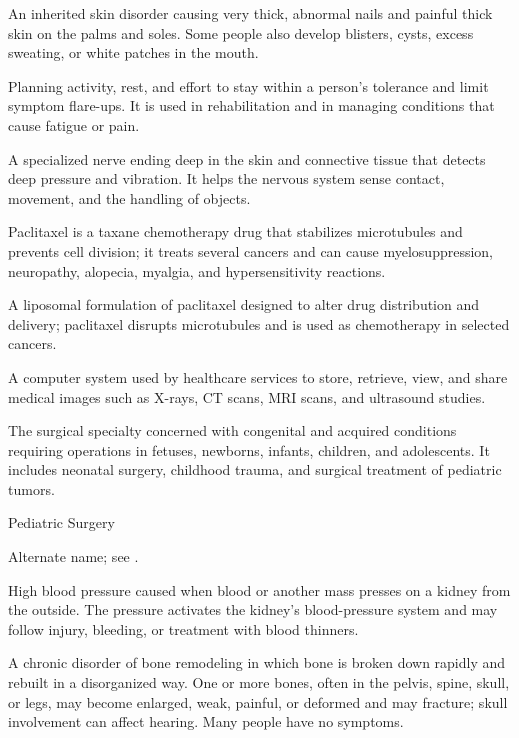  An inherited skin disorder causing very thick, abnormal nails and painful thick skin on the palms and soles. Some people also develop blisters, cysts, excess sweating, or white patches in the mouth.

 Planning activity, rest, and effort to stay within a person’s tolerance and limit symptom flare-ups. It is used in rehabilitation and in managing conditions that cause fatigue or pain.

 A specialized nerve ending deep in the skin and connective tissue that detects deep pressure and vibration. It helps the nervous system sense contact, movement, and the handling of objects.

 Paclitaxel is a taxane chemotherapy drug that stabilizes microtubules and prevents cell division; it treats several cancers and can cause myelosuppression, neuropathy, alopecia, myalgia, and hypersensitivity reactions.

 A liposomal formulation of paclitaxel designed to alter drug distribution and delivery; paclitaxel disrupts microtubules and is used as chemotherapy in selected cancers.

 A computer system used by healthcare services to store, retrieve, view, and share medical images such as X-rays, CT scans, MRI scans, and ultrasound studies.

 The surgical specialty concerned with congenital and acquired conditions requiring operations in fetuses, newborns, infants, children, and adolescents. It includes neonatal surgery, childhood trauma, and surgical treatment of pediatric tumors.

\synonyms
Pediatric Surgery

 Alternate name; see .

 High blood pressure caused when blood or another mass presses on a kidney from the outside. The pressure activates the kidney’s blood-pressure system and may follow injury, bleeding, or treatment with blood thinners.

 A chronic disorder of bone remodeling in which bone is broken down rapidly and rebuilt in a disorganized way. One or more bones, often in the pelvis, spine, skull, or legs, may become enlarged, weak, painful, or deformed and may fracture; skull involvement can affect hearing. Many people have no symptoms.

